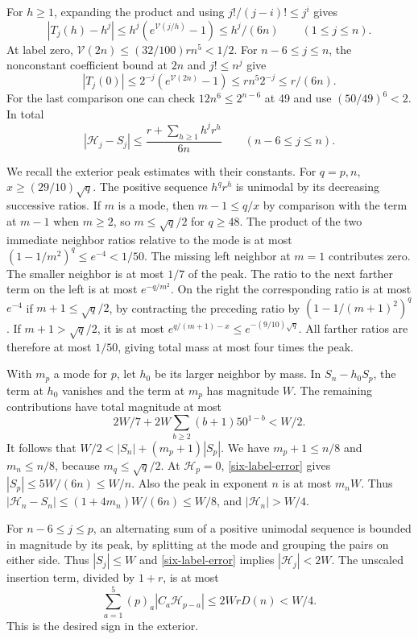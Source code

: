 For \(h\ge1\), expanding the product and using \(j!/(j-i)!\le j^i\) gives
\[
 |T_j(h)-h^j|
 \le h^j(e^{\mathcal V(j/h)}-1)
 \le h^j/(6n) \qquad (1\le j\le n).
\]
At label zero, \(\mathcal V(2n)\le (32/100)rn^5<1/2\). For \(n-6\le j\le n\), the nonconstant coefficient bound at \(2n\) and \(j!\le n^j\) give
\[
 |T_j(0)|\le 2^{-j}(e^{\mathcal V(2n)}-1)
          \le rn^5 2^{-j}\le r/(6n).
\]
For the last comparison one can check \(12n^6\le 2^{n-6}\) at 49 and use \((50/49)^6<2\). In total
\begin{equation}\label{six-label-error}
 |\mathcal H_j-S_j|\le
     \frac{r+\sum_{h\ge1}h^j r^h}{6n}\qquad(n-6\le j\le n).
\end{equation}

We recall the exterior peak estimates with their constants. For \(q=p,n\), \(x\ge(29/10)\sqrt q\). The positive sequence \(h^q r^h\) is unimodal by its decreasing successive ratios. If \(m\) is a mode, then \(m-1\le q/x\) by comparison with the term at \(m-1\) when \(m\ge2\), so \(m\le\sqrt q/2\) for \(q\ge48\). The product of the two immediate neighbor ratios relative to the mode is at most \((1-1/m^2)^q\le e^{-4}<1/50\). The missing left neighbor at \(m=1\) contributes zero. The smaller neighbor is at most \(1/7\) of the peak. The ratio to the next farther term on the left is at most \(e^{-q/m^2}\). On the right the corresponding ratio is at most \(e^{-4}\) if \(m+1\le\sqrt q/2\), by contracting the preceding ratio by \((1-1/(m+1)^2)^q\). If \(m+1>\sqrt q/2\), it is at most \(e^{q/(m+1)-x}\le e^{-(9/10)\sqrt q}\). All farther ratios are therefore at most \(1/50\), giving total mass at most four times the peak.

With \(m_p\) a mode for \(p\), let \(h_0\) be its larger neighbor by mass. In \(S_n-h_0S_p\), the term at \(h_0\) vanishes and the term at \(m_p\) has magnitude \(W\). The remaining contributions have total magnitude at most
\[
 2W/7+2W\sum_{b\ge2}(b+1)50^{1-b}<W/2 .
\]
It follows that \(W/2<|S_n|+(m_p+1)|S_p|\). We have \(m_p+1\le n/8\) and \(m_n\le n/8\), because \(m_q\le\sqrt q/2\). At \(\mathcal H_p=0\), \eqref{six-label-error} gives \(|S_p|\le5W/(6n)\le W/n\). Also the peak in exponent \(n\) is at most \(m_nW\). Thus \(|\mathcal H_n-S_n|\le (1+4m_n)W/(6n)\le W/8\), and \(|\mathcal H_n|>W/4\).

For \(n-6\le j\le p\), an alternating sum of a positive unimodal sequence is bounded in magnitude by its peak, by splitting at the mode and grouping the pairs on either side. Thus \(|S_j|\le W\) and \eqref{six-label-error} implies \(|\mathcal H_j|<2W\). The unscaled insertion term, divided by \(1+r\), is at most
\[
 \sum_{a=1}^5(p)_a |C_a\mathcal H_{p-a}|
       \le 2WrD(n)<W/4 .
\]
This is the desired sign in the exterior.

